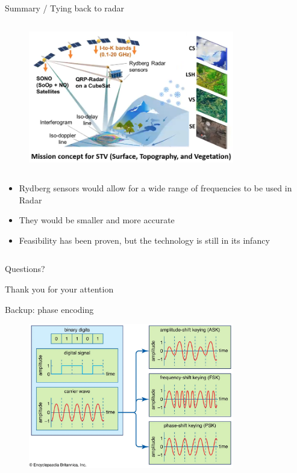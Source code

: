 \begin{columnframe}{Summary / Tying back to radar}
    \begin{column}{0.5\textwidth}
        \begin{figure}
            \centering
            \includegraphics[width=0.8\textwidth]{images/rydberg_radar_nasa.png}
        \end{figure}
    \end{column}
    \begin{column}{0.5\textwidth}
        \begin{itemize}
            \item Rydberg sensors would allow for a wide range of frequencies to be used in Radar
            \item They would be smaller and more accurate
            \item Feasibility has been proven, but the technology is still in its infancy
        \end{itemize}
    \end{column}
\end{columnframe}

\begin{frame}{}
    \centering
    \Large{Questions?}
\end{frame}

\begin{frame}{}
    \centering
    \Large{Thank you for your attention}
\end{frame}

\begin{frame}{Backup: phase encoding}
    \begin{figure}
        \centering
        \includegraphics[width=0.8\textwidth]{images/britanicca_phase_encoding.png}
    \end{figure}
\end{frame}

